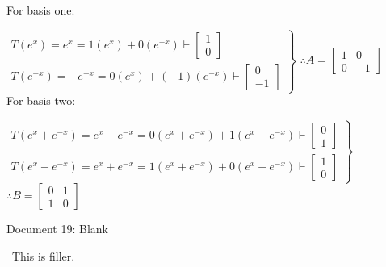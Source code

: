 \documentclass[12pt]{article}
\begin{document}
For basis one:

$\left.\begin{matrix}T(e^x)=e^x=1(e^x)+0(e^{-x})\vdash \begin{bmatrix}1\\0\end{bmatrix}\\T(e^{-x})=-e^{-x}=0(e^x)+(-1)(e^{-x})\vdash \begin{bmatrix}0\\-1\end{bmatrix}\end{matrix}\right\rbrace$
$\therefore A=\begin{bmatrix}1 & 0\\0 & -1\end{bmatrix}$\\

For basis two:

$\left.\begin{matrix}T(e^x+e^{-x})=e^x-e^{-x}=0(e^x+e^{-x})+1(e^x-e^{-x})\vdash \begin{bmatrix}0\\1\end{bmatrix}\\T(e^x-e^{-x})=e^x+e^{-x}=1(e^x+e^{-x})+0(e^x-e^{-x})\vdash \begin{bmatrix}1\\0\end{bmatrix}\end{matrix}\right\rbrace$
$\therefore B=\begin{bmatrix}0 & 1\\1 & 0\end{bmatrix}$

\newpage
\begin{center}
Document 19: Blank
\end{center}

\setlength{\leftskip}{0 in}
$\,\,\,$This is filler.
\end{document}
